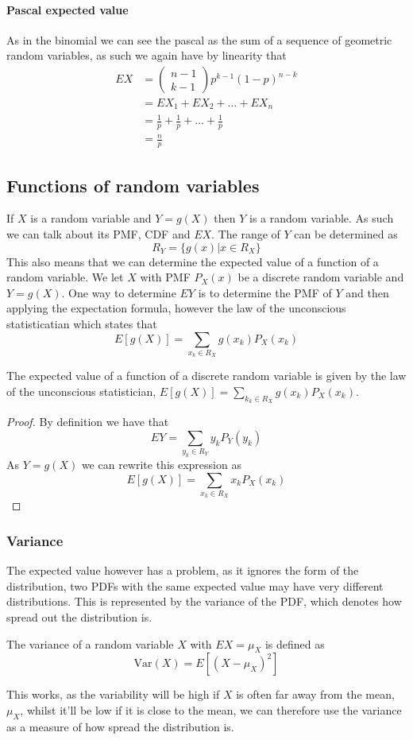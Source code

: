 \paragraph{Pascal expected value}
As in the binomial we can see the pascal as the sum of a sequence of geometric random variables, as such we again have by linearity that
\begin{align*}
    EX&=\begin{pmatrix}n-1\\k-1\end{pmatrix}p^{k-1}(1-p)^{n-k} \\
      &=EX_{1}+EX_{2}+\ldots+EX_{n} \\
      &=\frac{1}{p}+\frac{1}{p}+\ldots+\frac{1}{p} \\
      &=\frac{n}{p}
\end{align*}
\subsection{Functions of random variables}
If $X$ is a random variable and $Y=g(X)$ then $Y$ is a random variable. As such we can talk about its PMF, CDF and $EX$. The range of $Y$ can be determined as
\[
    R_{Y}=\{g(x)|x\in R_{X}\}
\]
This also means that we can determine the expected value of a function of a random variable. We let $X$ with PMF $P_{X}(x)$ be a discrete random variable and $Y=g(X)$. One way to determine $EY$ is to determine the PMF of $Y$ and then applying the expectation formula, however the law of the unconscious statisticatian which states that
\[
    E[g(X)]=\sum_{x_{k}\in R_{X}}g(x_{k})P_{X}(x_{k})
\]
\begin{theorem}
    The expected value of a function of a discrete random variable is given by the law of the unconscious statistician, $E[g(X)]=\sum_{k_{k}\in R_{X}}g(x_{k})P_{X}(x_{k})$.
\end{theorem}
\begin{proof}
    By definition we have that
    \[
        EY=\sum_{y_{k}\in R_{Y}}y_{k}P_{Y}(y_{k})
    \]
    As $Y=g(X)$ we can rewrite this expression as
    \[
        E[g(X)]=\sum_{x_{k}\in R_{X}}x_{k}P_{X}(x_{k})
    \]
\end{proof}
\subsubsection{Variance}
The expected value however has a problem, as it ignores the form of the distribution, two PDFs with the same expected value may have very different distributions. This is represented by the variance of the PDF, which denotes how spread out the distribution is.
\begin{definition}
  The variance of a random variable $X$ with $EX=\mu_{X}$ is defined as
  \[
      \text{Var}(X)=E[(X-\mu_{X})^{2}]
  \]
\end{definition}
This works, as the variability will be high if $X$ is often far away from the mean, $\mu_{X}$, whilst it'll be low if it is close to the mean, we can therefore use the variance as a measure of how spread the distribution is.

